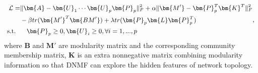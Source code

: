 \begin{equation}
\small
\begin{aligned}
\mathcal{L} = & \|\bm{A} - \bm{U}_1\cdots \bm{U}_p \bm{P}_p\|_F^2 + \alpha \|\bm{M'} - \bm{P}_{p}^{T} \bm{K}^{T}\|_F^2 \\
& - \beta tr(\bm{M'}^{T}\bm{BM'}) + \lambda tr(\bm{P}_p \bm{L} \bm{P}_p^T) \\
\textrm{s.t.}  ~~  & \quad \bm{P}_p \geq 0, \bm{U}_i \geq 0, \forall i=1,...,p
\end{aligned},
\end{equation}
where $\bm{B}$ and $\bm{M'}$ are modularity matrix and the corresponding community membership matrix, $\bm{K}$ is an extra nonnegative matrix combining modularity information so that DNMF can explore the hidden features of network topology.

